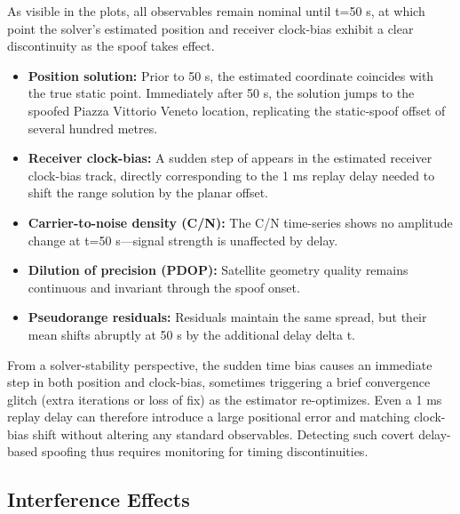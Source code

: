         \noindent As visible in the plots, all observables remain nominal until t=50 s, at which point the solver's estimated position and receiver clock-bias exhibit a clear discontinuity as the spoof takes effect.

        \begin{itemize}
            \item \textbf{Position solution:} Prior to 50 s, the estimated coordinate coincides with the true static point. Immediately after 50 s, the solution jumps to the spoofed Piazza Vittorio Veneto location, replicating the static-spoof offset of several hundred metres.  
            \item \textbf{Receiver clock-bias:} A sudden step of appears in the estimated receiver clock-bias track, directly corresponding to the 1 ms replay delay needed to shift the range solution by the planar offset.  
            \item \textbf{Carrier-to-noise density (C/N):} The C/N time-series shows no amplitude change at t=50 s—signal strength is unaffected by delay.  
            \item \textbf{Dilution of precision (PDOP):} Satellite geometry quality remains continuous and invariant through the spoof onset.  
            \item \textbf{Pseudorange residuals:} Residuals maintain the same spread, but their mean shifts abruptly at 50 s by the additional delay delta t.  
        \end{itemize}
        
        \noindent From a solver-stability perspective, the sudden time bias causes an immediate step in both position and clock-bias, sometimes triggering a brief convergence glitch (extra iterations or loss of fix) as the estimator re-optimizes. 
        Even a 1 ms replay delay can therefore introduce a large positional error and matching clock-bias shift without altering any standard observables. Detecting such covert delay-based spoofing thus requires monitoring for timing discontinuities.

    \subsection{Interference Effects}
    

